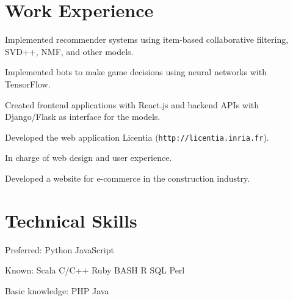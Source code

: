 \documentclass[]{deedy-resume-openfont}
\begin{document}

\section{Work Experience}

\begin{tightemize}
\item Implemented recommender systems using item-based collaborative filtering, SVD++,
NMF, and other models.
\item Implemented bots to make game decisions using neural networks with 
TensorFlow.
\item Created frontend applications with React.js and
backend APIs with Django/Flask as interface for the models.
\end{tightemize}
\sectionsep

\begin{tightemize}
\item Developed the web application Licentia (\texttt{http://licentia.inria.fr}).
\item In charge of web design and user experience.
\end{tightemize}
\sectionsep

\begin{tightemize}
\item Developed a website for e-commerce in the construction industry.
\end{tightemize}
\sectionsep


\section{Technical Skills}

\descript{}
\begin{tightemize}
\item Preferred: Python \textbullet{} JavaScript
\item Known: Scala \textbullet{} C/C++ \textbullet{} Ruby \textbullet{} 
BASH \textbullet{} R \textbullet{} SQL \textbullet{} Perl %
\item Basic knowledge: PHP \textbullet{} Java %
\end{tightemize}
\sectionsep
\end{document}
